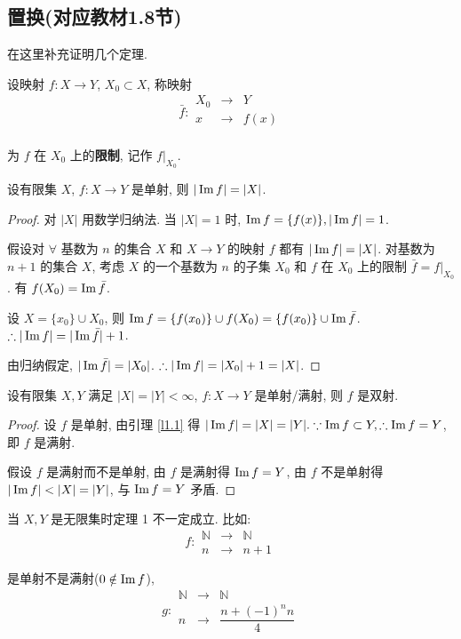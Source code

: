 \documentclass{ctexart}
\begin{document}
\subsection{置换(对应教材1.8节)}
在这里补充证明几个定理.
\begin{definition}
    设映射 $f:X\to Y$, $X_0\subset X$, 称映射
    \[\bar{f}:\begin{array}{rcl}
        X_0 & \to & Y \\
        x & \to & f(x) \\
    \end{array}\]

    为 $f$ 在 $X_0$ 上的\textbf{限制}, 记作 $f|_{X_0}$.
\end{definition}
\begin{lemma}\label{l1.1}
    设有限集 $X$, $f:X\to Y$ 是单射, 则 $|\operatorname{Im} f|=|X|$.
\end{lemma}
\begin{proof}
    对 $|X|$ 用数学归纳法. 当 $|X|=1$ 时, $\operatorname{Im} f=\{f(x)\},|\operatorname{Im} f|=1$.

    假设对 $\forall$ 基数为 $n$ 的集合 $X$ 和 $X\to Y$ 的映射 $f$ 都有 $|\operatorname{Im} f|=|X|$. 对基数为 $n+1$ 的集合 $X$, 考虑 $X$ 的一个基数为 $n$ 的子集 $X_0$ 和 $f$ 在 $X_0$ 上的限制 $\bar{f}=f|_{X_0}$. 有 $f(X_0)=\operatorname{Im} \bar{f}$.

    设 $X=\{x_0\}\cup X_0$, 则 $\operatorname{Im} f=\{f(x_0)\}\cup f(X_0)=\{f(x_0)\}\cup\operatorname{Im} \bar{f}$. $\therefore|\operatorname{Im} f|=|\operatorname{Im} \bar{f}|+1$.

    由归纳假定, $|\operatorname{Im} \bar{f}|=|X_0|$. $\therefore|\operatorname{Im} f|=|X_0|+1=|X|$.
\end{proof}
\begin{theorem}
    设有限集 $X,Y$ 满足 $|X|=|Y|<\infty$, $f:X\to Y$ 是单射/满射, 则 $f$ 是双射.
\end{theorem}
\begin{proof}
    设 $f$ 是单射, 由引理 \ref{l1.1} 得 $|\operatorname{Im} f|=|X|=|Y|.\because\operatorname{Im} f\subset Y,\therefore\operatorname{Im} f=Y$, 即 $f$ 是满射.

    假设 $f$ 是满射而不是单射, 由 $f$ 是满射得 $\operatorname{Im} f=Y$, 由 $f$ 不是单射得 $|\im f|<|X|=|Y|$, 与 $\operatorname{Im} f=Y$ 矛盾.
\end{proof}

当 $X,Y$ 是无限集时定理 1 不一定成立. 比如:
\[f:\begin{array}{rcl}
\mathbb{N} & \to & \mathbb{N} \\
n & \to & n+1
\end{array}\]

是单射不是满射($0\notin\operatorname{Im} f$),
\[g:\begin{array}{rcl}
\mathbb{N} & \to & \mathbb{N} \\
n & \to & \dfrac{n+(-1)^nn}{4}
\end{array}\]
\end{document}
